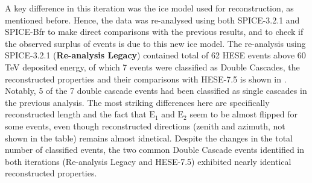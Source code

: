 A key difference in this iteration was the ice model used for reconstruction, as mentioned before. Hence, the data was re-analysed using both SPICE-3.2.1 and SPICE-Bfr to make direct comparisons with the previous results, and to check if the observed surplus of events is due to this new ice model. The re-analysis using SPICE-3.2.1 (\textbf{Re-analysis Legacy}) contained total of 62 HESE events above 60 TeV deposited energy, of which 7 events were classified as Double Cascades, the reconstructed properties and their comparisons with HESE-7.5 is shown in . Notably, 5 of the 7 double cascade events had been classified as single cascades in the previous analysis. The most striking differences here are specifically reconstructed length and the fact that $\mathrm{E}_1$ and $\mathrm{E}_2$ seem to be almost flipped for some events, even though reconstructed directions (zenith and azimuth, not shown in the table) remains almost idnetical. Despite the changes in the total number of classified events, the two common Double Cascade events identified in both iterations (Re-analysis Legacy and HESE-7.5) exhibited nearly identical reconstructed properties.


